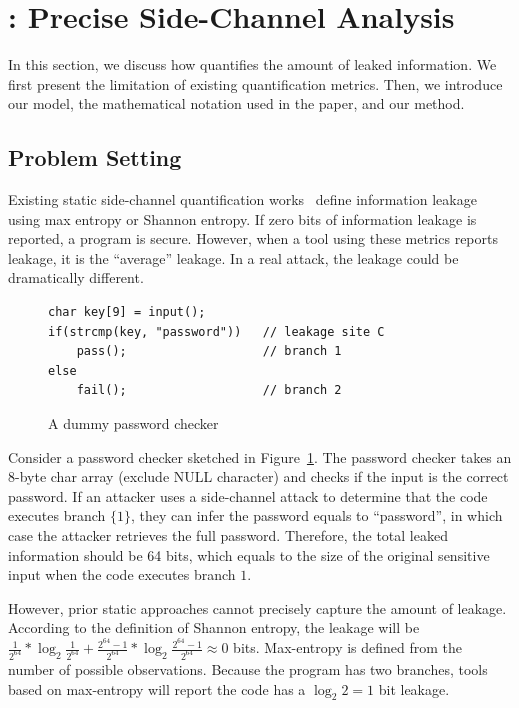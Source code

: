 \section{\tool{}: Precise Side-Channel Analysis}
\label{sec:trace-qif}
In this section, we discuss how \tool{} quantifies the amount of leaked
information. We first present the limitation of existing quantification metrics.
Then, we introduce our model, the mathematical notation used in the
paper, and our method.

\subsection{Problem Setting}
Existing static side-channel quantification
works~\cite{182946,Wichelmann:2018:MFF:3274694.3274741,zhang2010sidebuster} define information
leakage using max entropy or Shannon entropy.  If zero bits of
information leakage is reported, a program is secure. However, when a tool using these metrics reports leakage, it is the ``average'' leakage. In a real attack, the leakage could be dramatically different.

 \begin{figure}[h!]
    \vspace*{-5pt}
    \centering
    \begin{lstlisting}[xleftmargin=.03\textwidth,xrightmargin=.01\textwidth]
char key[9] = input();
if(strcmp(key, "password"))   // leakage site C
    pass();                   // branch 1
else
    fail();                   // branch 2
\end{lstlisting}
\vspace*{-10pt}
    \caption{A dummy password checker}
    \label{fig:password-checker}
\vspace*{-5pt}
\end{figure}

Consider a password checker sketched in Figure~\ref{fig:password-checker}.
The password checker takes an 8-byte char array (exclude \textsf{NULL} character) 
and checks if the input is the correct password. If an attacker uses a side-channel attack to determine that the code executes branch
$\{{1\}}$, they can infer the password equals to
``password'', in which case the attacker retrieves the full password.
Therefore, the total leaked information should be 64 bits, which equals to the
size of the original sensitive input when the code executes branch
$1$.

However, prior static approaches cannot precisely capture the amount of leakage. According to the definition of Shannon entropy, the leakage will be
$\frac{1}{2^{64}}*\log_{2}\frac{1}{2^{64}} + \frac{2^{64}-1}{2^{64}}
*\log_{2}\frac{2^{64}-1}{2^{64}} \approx 0$ bits. Max-entropy is defined from the
number of possible observations. Because the program has two
branches, tools based on max-entropy will report the code has a $\log_2{2} = 1$
bit leakage.

